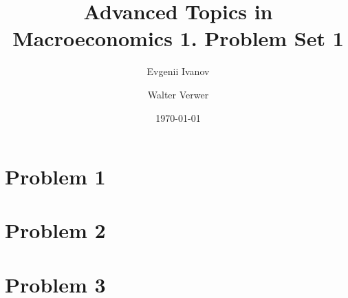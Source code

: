 \documentclass[12pt]{article}
\newcommand{\?}{\stackrel{?}{=}}
\begin{document}
\title{\vspace{-1.5cm} Advanced Topics in Macroeconomics 1. Problem Set 1}
\author{Evgenii Ivanov \and Walter Verwer}
\date{\today}
 
\maketitle

\section*{Problem 1}

\section*{Problem 2}

\section*{Problem 3}
\end{document}
